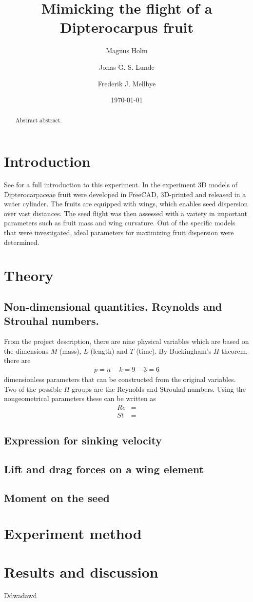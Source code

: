 \documentclass[aps,reprint]{revtex4-1}
\newcommand\blankpage{%
  \null
  \thispagestyle{empty}%
  \addtocounter{page}{-1}%
  \newpage}
\begin{document}
\title{Mimicking the flight of a Dipterocarpus fruit}
\author{Magnus Holm}
\author{Jonas G. S. Lunde}
\author{Frederik J. Mellbye}
\date{\today}

\begin{abstract}
Abstract abstract.
\end{abstract}
\maketitle

\section{Introduction}
\label{sec:introduction}
See \cite{instruks} for a full introduction to this experiment. In the experiment
3D models of Dipterocarpaceae fruit were developed in FreeCAD, 3D-printed and
released in a water cylinder. The fruits are equipped with wings, which enables
seed dispersion over vast distances. The seed flight was then assessed with a
variety in important parameters such as fruit mass and wing curvature. Out of the
specific models that were investigated, ideal parameters for maximizing fruit
dispersion were determined.

\section{Theory}
\label{sec:theory}
\subsection{Non-dimensional quantities. Reynolds and Strouhal numbers.}
From the project description, there are nine physical variables which are based
on the dimensions $M$ (mass), $L$ (length) and $T$ (time). By Buckingham's
$\Pi$-theorem, there are
\begin{align*}
  p = n - k = 9 - 3 = 6
\end{align*}
dimensionless parameters that can be constructed from the original variables.
Two of the possible $\Pi$-groups are the Reynolds and Strouhal numbers. Using
the nongeometrical parameters these can be written as
\begin{align}
  Re &= \\
  St &=
\end{align}
\subsection{Expression for sinking velocity}

\subsection{Lift and drag forces on a wing element}

\subsection{Moment on the seed}

\section{Experiment method}
\label{sec:method}
\section{Results and discussion}
\label{sec:results}
Ddwadawd

\blankpage
\end{document}
